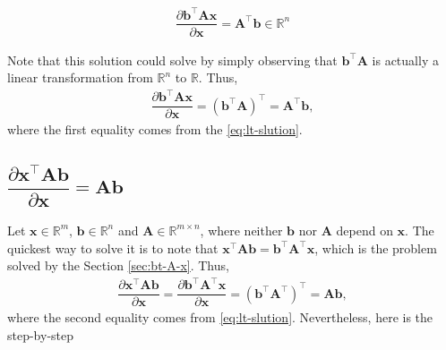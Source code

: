 \documentclass{article}
\newcommand{\trans}{\top}
\begin{document}
\begin{align}
    \boxed{\dfrac{\partial \mathbf{b}^\trans \mathbf{A} \mathbf{x}}{\partial \mathbf{x}} = \mathbf{A}^\trans \mathbf{b} \in \mathbb{R}^{n}}
\end{align}

Note that this solution could solve by simply observing that \(\mathbf{\mathbf{b}^\trans \mathbf{A}}\) is actually a linear transformation from \(\mathbb{R}^{n}\) to \(\mathbb{R}\). Thus,
\begin{align}
    \dfrac{\partial \mathbf{b}^\trans \mathbf{A} \mathbf{x}}{\partial \mathbf{x}} = \left( \mathbf{b}^\trans \mathbf{A} \right)^{\trans} = \mathbf{A}^\trans \mathbf{b},
\end{align}
where the first equality comes from the \eqref{eq:lt-slution}.

\subsection{\(\dfrac{\partial \mathbf{x}^\trans \mathbf{A} \mathbf{b}}{\partial \mathbf{x}} = \mathbf{Ab}\)}
Let \(\mathbf{x} \in \mathbb{R}^{m}\), \(\mathbf{b} \in \mathbb{R}^{n}\) and \(\mathbf{A}\in \mathbb{R}^{m\times n}\), where neither \(\mathbf{b}\) nor \(\mathbf{A}\) depend on \(\mathbf{x}\). The quickest way to solve it is to note that \(\mathbf{x}^\trans \mathbf{A} \mathbf{b} =  \mathbf{b}^\trans \mathbf{A}^\trans \mathbf{x}\), which is the problem solved by the Section \ref{sec:bt-A-x}. Thus,
\begin{align}
    \dfrac{\partial \mathbf{x}^\trans \mathbf{A} \mathbf{b}}{\partial \mathbf{x}} = \dfrac{\partial \mathbf{b}^\trans \mathbf{A}^\trans \mathbf{x}}{\partial \mathbf{x}} = \left( \mathbf{b}^\trans \mathbf{A}^\trans \right)^{\trans} = \mathbf{A} \mathbf{b},
\end{align}
where the second equality comes from \eqref{eq:lt-slution}. Nevertheless, here is the step-by-step
\end{document}
